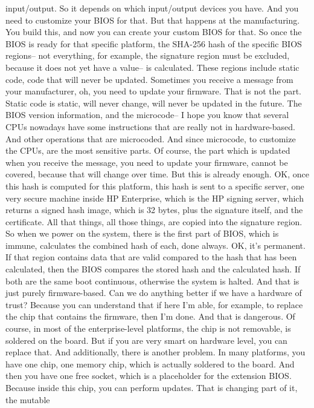  input/output. So it depends on which input/output devices you have. And you
 need to customize your BIOS for that. But that happens at the manufacturing.
 You build this, and now you can create your custom BIOS for that. So once the
 BIOS is ready for that specific platform, the SHA-256 hash of the specific
 BIOS regions-- not everything, for example, the signature region must be
 excluded, because it does not yet have a value-- is calculated. These regions
 include static code, code that will never be updated. Sometimes you receive a
 message from your manufacturer, oh, you need to update your firmware. That is
 not the part. Static code is static, will never change, will never be updated
 in the future. The BIOS version information, and the microcode-- I hope you
 know that several CPUs nowadays have some instructions that are really not in
 hardware-based. And other operations that are microcoded. And since microcode,
 to customize the CPUs, are the most sensitive parts. Of course, the part which
 is updated when you receive the message, you need to update your firmware,
 cannot be covered, because that will change over time. But this is already
 enough. OK, once this hash is computed for this platform, this hash is sent to
 a specific server, one very secure machine inside HP Enterprise, which is the
 HP signing server, which returns a signed hash image, which is 32 bytes, plus
 the signature itself, and the certificate. All that things, all those things,
 are copied into the signature region. So when we power on the system, there is
 the first part of BIOS, which is immune, calculates the combined hash of each,
 done always. OK, it's permanent. If that region contains data that are valid
 compared to the hash that has been calculated, then the BIOS compares the
 stored hash and the calculated hash. If both are the same boot continuous,
 otherwise the system is halted. And that is just purely firmware-based. Can we
 do anything better if we have a hardware of trust? Because you can understand
 that if here I'm able, for example, to replace the chip that contains the
 firmware, then I'm done. And that is dangerous. Of course, in most of the
 enterprise-level platforms, the chip is not removable, is soldered on the
 board. But if you are very smart on hardware level, you can replace that. And
 additionally, there is another problem. In many platforms, you have one chip,
 one memory chip, which is actually soldered to the board. And then you have
 one free socket, which is a placeholder for the extension BIOS. Because inside
 this chip, you can perform updates. That is changing part of it, the mutable
